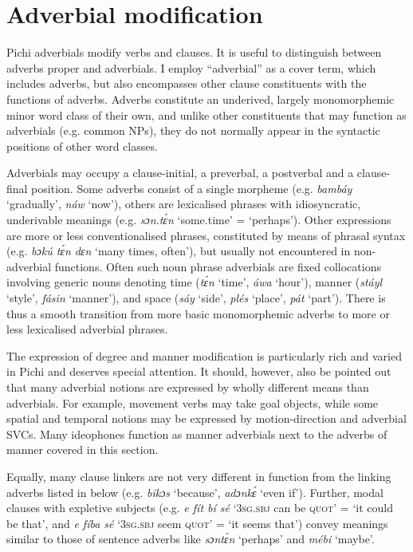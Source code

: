 \section{Adverbial modification}\label{sec:7.7}

Pichi adverbials modify verbs and clauses. It is useful to distinguish between adverbs proper and adverbials. I employ “adverbial” as a cover term, which includes adverbs, but also encompasses other clause constituents with the functions of adverbs. Adverbs constitute an underived, largely monomorphemic minor word class of their own, and unlike other constituents that may function as adverbials (e.g. common NPs), they do not normally appear in the syntactic positions of other word classes. 


Adverbials may occupy a clause-initial, a preverbal, a postverbal and a clause-final position. Some adverbs consist of a single morpheme (e.g. \textit{bambáy} ‘gradually’, \textit{náw} ‘now’), others are lexicalised phrases with idiosyncratic, underivable meanings (e.g. \textit{sɔn.tɛ́n} ‘some.time’ = ‘perhaps’). Other expressions are more or less conventionalised phrases, constituted by means of phrasal syntax (e.g. \textit{bɔkú tɛ́n dɛn} ‘many times, often’), but usually not encountered in non-adverbial functions. Often such noun phrase adverbials are fixed collocations involving generic nouns denoting time (\textit{tɛ́n} ‘time’, \textit{áwa} ‘hour’), manner (\textit{stáyl} ‘style’, \textit{fásin} ‘manner’), and space (\textit{sáy} ‘side’, \textit{plés} ‘place’, \textit{pát} ‘part’). There is thus a smooth transition from more basic monomorphemic adverbs to more or less lexicalised adverbial phrases. 



The expression of degree and manner modification is particularly rich and varied in Pichi and deserves special attention. It should, however, also be pointed out that many adverbial notions are expressed by wholly different means than adverbials. For example, movement verbs may take goal objects, while some spatial and temporal notions may be expressed by motion-direction and adverbial SVCs. Many ideophones function as manner adverbials next to the adverbs of manner covered in this section. 



Equally, many clause linkers are not very different in function from the linking adverbs listed in  below (e.g. \textit{bikɔs} ‘because’, \textit{adɔnkɛ́} ‘even if’). Further, modal clauses with expletive subjects (e.g. \textit{e fít bí sé} ‘\textsc{3sg.sbj} can be \textsc{quot}’ = ‘it could be that’, and \textit{e fíba sé} ‘\textsc{3sg.sbj} seem \textsc{quot}’ = ‘it seems that’) convey meanings similar to those of sentence adverbs like \textit{sɔntɛ́n} ‘perhaps’ and \textit{mébi} ‘maybe’.


